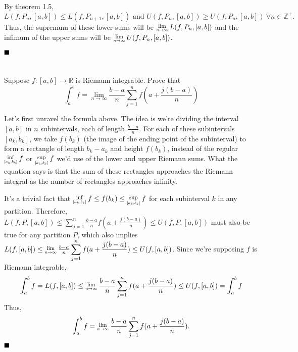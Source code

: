 \documentclass[11pt, a4paper, tikz]{article}
\newcommand{\centsection}[1]{
	\section*{\centering{#1}}
}
\renewcommand{\qed}{\hfill\blacksquare}
\newcommand{\Lim}[1]{\raisebox{0.5ex}{\scalebox{0.8}{$\displaystyle \lim_{#1}\;$}}}
\newcommand{\Inf}[1]{\raisebox{0.5ex}{\scalebox{0.8}{$\displaystyle \inf_{#1}\;$}}}
\newcommand{\Sup}[1]{\raisebox{0.5ex}{\scalebox{0.8}{$\displaystyle \sup_{#1}\;$}}}
\newcommand{\Sum}[2]{\displaystyle \sum_{#1}^{#2}}
\newcommand{\Int}[2]{\displaystyle \int_{#1}^{#2}}
\newcommand{\integers}{
	\ensuremath{\mathbb{Z}}
}
\newcommand{\reals}{
	\ensuremath{\mathbb{R}}
}
\begin{document}
	By theorem 1.5, \[L(f,P_n,[a,b]) \leq L(f,P_{n+1},[a,b]) \textrm{ and } U(f,P_n,[a,b]) \geq U(f,P_n,[a,b])\ \forall n\in\integers^+.\] Thus, the supremum of these lower sums will be $\Lim{n\rightarrow\infty}L(f,P_n,[a,b])$ and the infimum of the upper sums will be $\Lim{n\rightarrow\infty}U(f,P_n,[a,b])$.
	
	$\qed$
	
	\centsection{Exercise 8}
	
	\begin{formulationBox}
		Suppose $f:[a,b]\rightarrow\reals$ is Riemann integrable. Prove that \[\int_a^bf=\lim_{n\rightarrow\infty}\frac{b-a}{n}\sum_{j=1}^{n}f(a+\frac{j(b-a)}{n})\]
	\end{formulationBox}
	
	Let's first unravel the formula above. The idea is we're dividing the interval $[a,b]$ in $n$ subintervals, each of length $\frac{b-a}{n}$. For each of these subintervals $[a_k, b_k]$, we take $f(b_k)$ (the image of the ending point of the subinterval) to form a rectangle of length $b_k-a_k$ and height $f(b_k)$, instead of the regular $\Inf{[a_k, b_k]}f$ or $\Sup{[a_k, b_k]}f$ we'd use of the lower and upper Riemann sums. What the equation says is that the sum of these rectangles approaches the Riemann integral as the number of rectangles approaches infinity.
	
	It's a trivial fact that $\Inf{[a_k, b_k]}f \leq f(b_k) \leq \Sup{[a_k, b_k]}f$ for each subinterval $k$ in any partition. Therefore, $L(f, P, [a,b]) \leq \Sum{j=1}{n}\frac{b-a}{n}f(a + \frac{j(b-a)}{n}) \leq U(f, P, [a,b])$ must also be true for any partition $P$, which also implies $L(f, [a,b]) \leq \Lim{n\rightarrow\infty}\frac{b-a}{n}\Sum{j=1}{n}f(a + \frac{j(b-a)}{n}) \leq U(f, [a,b])$. Since we're supposing $f$ is Riemann integrable, \[\Int{a}{b}f = L(f, [a,b]) \leq \Lim{n\rightarrow\infty}\frac{b-a}{n}\Sum{j=1}{n}f(a + \frac{j(b-a)}{n}) \leq U(f, [a,b]) = \Int{a}{b}f\]
	Thus,
	\[\int_a^bf = \Lim{n\rightarrow\infty}\frac{b-a}{n}\Sum{j=1}{n}f(a + \frac{j(b-a)}{n}).\]
	$\qed$
\end{document}
